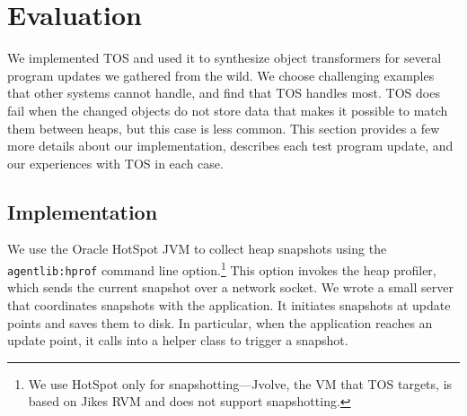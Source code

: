 \documentclass[natbib,10pt]{sigplanconf}
\newcommand{\TOS}{TOS\xspace}
\begin{document}
\section{Evaluation}
\label{sec:experiments}

We implemented \TOS and used it to synthesize object
transformers for several program updates we gathered from the wild.  
We choose challenging examples that other
systems cannot handle, and find that \TOS handles most.  \TOS does
fail when the changed objects do not store data
that makes it possible to match them between heaps, but this case is
less common.
This section provides a few more details about our implementation,
describes each test program update, and
our experiences with \TOS in each case.

\subsection{Implementation}

We use the Oracle HotSpot JVM to collect heap snapshots using the
\texttt{agentlib:hprof} command line option.\footnote{We use HotSpot
  only for snapshotting---Jvolve, the VM that \TOS targets, is based
  on Jikes RVM and does not support snapshotting.}
 This option invokes the
heap profiler, which sends the current snapshot over a
network socket.  We wrote a small server that coordinates snapshots
with the application. It initiates snapshots at update points and saves them
to disk.  In particular, when the application
reaches an update point, it calls into a helper class to trigger a
snapshot. %

\end{document}
